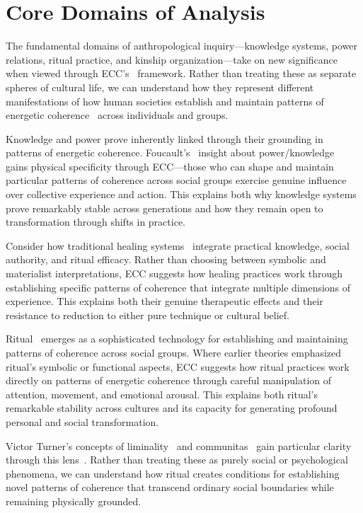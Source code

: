 \section{Core Domains of Analysis}

The fundamental domains of anthropological inquiry---knowledge systems, power relations, ritual practice, and kinship organization---take on new significance when viewed through ECC's~ framework. Rather than treating these as separate spheres of cultural life, we can understand how they represent different manifestations of how human societies establish and maintain patterns of energetic coherence~ across individuals and groups.

Knowledge and power prove inherently linked through their grounding in patterns of energetic coherence. Foucault's~\cite{foucault1980power} insight about power/knowledge~ gains physical specificity through ECC---those who can shape and maintain particular patterns of coherence across social groups exercise genuine influence over collective experience and action. This explains both why knowledge systems prove remarkably stable across generations and how they remain open to transformation through shifts in practice.

Consider how traditional healing systems~ integrate practical knowledge, social authority, and ritual efficacy. Rather than choosing between symbolic and materialist interpretations, ECC suggests how healing practices work through establishing specific patterns of coherence that integrate multiple dimensions of experience. This explains both their genuine therapeutic effects and their resistance to reduction to either pure technique or cultural belief.

Ritual~ emerges as a sophisticated technology for establishing and maintaining patterns of coherence across social groups. Where earlier theories emphasized ritual's symbolic or functional aspects, ECC suggests how ritual practices work directly on patterns of energetic coherence through careful manipulation of attention, movement, and emotional arousal. This explains both ritual's remarkable stability across cultures and its capacity for generating profound personal and social transformation.

Victor Turner's concepts of liminality~ and communitas~ gain particular clarity through this lens~\cite{turner1967forest}. Rather than treating these as purely social or psychological phenomena, we can understand how ritual creates conditions for establishing novel patterns of coherence that transcend ordinary social boundaries while remaining physically grounded.

